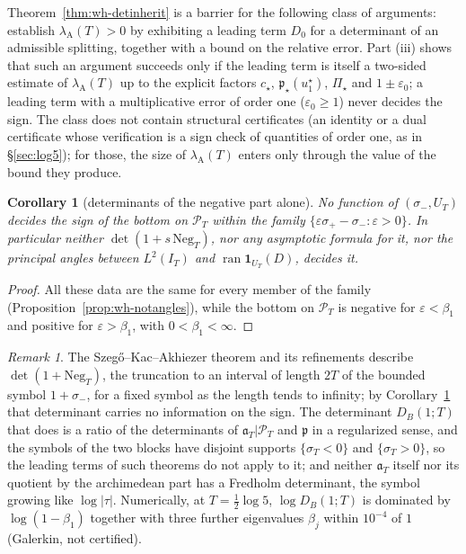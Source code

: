 \documentclass[11pt]{amsart}
\newtheorem{corollary}[theorem]{Corollary}
\theoremstyle{definition}
\theoremstyle{remark}
\newtheorem{remark}[theorem]{Remark}
\newcommand{\PT}{\mathcal P_T}
\newcommand{\IT}{I_T}
\newcommand{\lamA}{\lambda_{\mathrm A}(T)}
\newcommand{\sT}{\sigma_T}
\begin{document}
Theorem~\ref{thm:wh-detinherit} is a barrier for the following class of arguments: establish $\lamA>0$ by
exhibiting a leading term $D_0$ for a determinant of an admissible splitting, together with a bound on the
relative error. Part (iii) shows that such an argument succeeds only if the leading term is itself a two-sided
estimate of $\lamA$ up to the explicit factors $c_\star$, $\mathfrak p_\star(u^\star_1)$, $\Pi_\star$ and $1\pm\varepsilon_0$; a leading
term with a multiplicative error of order one ($\varepsilon_0\ge1$) never decides the sign. The class does not
contain structural certificates (an identity or a dual certificate whose verification is a sign check of
quantities of order one, as in \S\ref{sec:log5}); for those, the size of $\lamA$ enters only through the
value of the bound they produce.

\begin{corollary}[determinants of the negative part alone]\label{cor:wh-negonly}
No function of $(\sigma_-,U_T)$ decides the sign of the bottom on $\PT$ within the family
$\{\varepsilon\sigma_+-\sigma_-:\varepsilon>0\}$. In particular neither $\det(1+s\,\mathrm{Neg}_T)$, nor any asymptotic formula for
it, nor the principal angles between $L^2(\IT)$ and $\operatorname{ran}\mathbf 1_{U_T}(D)$, decides it.
\end{corollary}

\begin{proof}
All these data are the same for every member of the family (Proposition~\ref{prop:wh-notangles}), while the
bottom on $\PT$ is negative for $\varepsilon<\beta_1$ and positive for $\varepsilon>\beta_1$, with $0<\beta_1<\infty$.
\end{proof}

\begin{remark}\label{rem:wh-det}
The Szeg\H{o}--Kac--Akhiezer theorem and its refinements \cite[\S10.9]{BottcherSilbermann2006} describe
$\det(1+\mathrm{Neg}_T)$, the truncation to an interval of length $2T$ of the bounded symbol $1+\sigma_-$, for a fixed
symbol as the length tends to infinity; by Corollary~\ref{cor:wh-negonly} that determinant carries no
information on the sign. The determinant $D_B(1;T)$ that does is a ratio of the determinants of
$\mathfrak a_T|\PT$ and $\mathfrak p$ in a regularized sense, and the symbols of the two blocks have disjoint supports
$\{\sT<0\}$ and $\{\sT>0\}$, so the leading terms of such theorems do not apply to it; and neither $\mathfrak a_T$
itself nor its quotient by the archimedean part has a Fredholm determinant, the symbol growing like
$\log|\tau|$. Numerically, at $T=\frac12\log5$, $\log D_B(1;T)$ is dominated by $\log(1-\beta_1)$ together with
three further eigenvalues $\beta_j$ within $10^{-4}$ of $1$ (Galerkin, not certified).
\end{remark}
\end{document}
